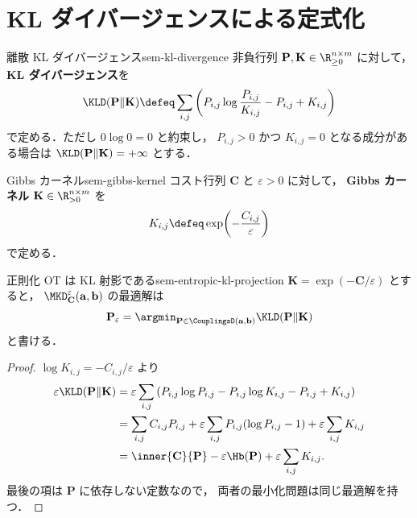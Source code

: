\section{KL ダイバージェンスによる定式化}
\label{sec:sem-kl-formulation}

\begin{definition}{離散 KL ダイバージェンス}{sem-kl-divergence}
  非負行列 $\mathbf{P}, \mathbf{K} \in \R_{\geq 0}^{n \times m}$ に対して，
  \textbf{KL ダイバージェンス}を
  \[
    \KLD(\mathbf{P} \| \mathbf{K})
    \defeq
    \sum_{i,j}
    \left(
      P_{i,j}\log\frac{P_{i,j}}{K_{i,j}}
      - P_{i,j} + K_{i,j}
    \right)
  \]
  で定める．ただし $0\log 0 = 0$ と約束し，
  $P_{i,j} > 0$ かつ $K_{i,j}=0$ となる成分がある場合は
  $\KLD(\mathbf{P}\|\mathbf{K}) = +\infty$ とする．
\end{definition}

\begin{definition}{Gibbs カーネル}{sem-gibbs-kernel}
  コスト行列 $\mathbf{C}$ と $\varepsilon > 0$ に対して，
  \textbf{Gibbs カーネル} $\mathbf{K} \in \R_{>0}^{n \times m}$ を
  \[
    K_{i,j} \defeq \exp\!\left(-\frac{C_{i,j}}{\varepsilon}\right)
  \]
  で定める．
\end{definition}

\begin{proposition}{正則化 OT は KL 射影である}{sem-entropic-kl-projection}
  $\mathbf{K} = \exp(-\mathbf{C}/\varepsilon)$ とすると，
  $\MKD_{\mathbf{C}}^\varepsilon(\mathbf{a}, \mathbf{b})$ の最適解は
  \[
    \mathbf{P}_\varepsilon
    =
    \argmin_{\mathbf{P} \in \CouplingsD(\mathbf{a}, \mathbf{b})}
    \KLD(\mathbf{P}\|\mathbf{K})
  \]
  と書ける．
\end{proposition}

\begin{proof}
  $\log K_{i,j} = -C_{i,j}/\varepsilon$ より
  \begin{align*}
    \varepsilon \KLD(\mathbf{P}\|\mathbf{K})
    &=
    \varepsilon\sum_{i,j}
    \left(
      P_{i,j}\log P_{i,j}
      - P_{i,j}\log K_{i,j}
      - P_{i,j}
      + K_{i,j}
    \right) \\
    &=
    \sum_{i,j} C_{i,j}P_{i,j}
    + \varepsilon\sum_{i,j} P_{i,j}(\log P_{i,j}-1)
    + \varepsilon\sum_{i,j} K_{i,j} \\
    &=
    \inner{\mathbf{C}}{\mathbf{P}} - \varepsilon \Hb(\mathbf{P})
    + \varepsilon\sum_{i,j} K_{i,j}.
  \end{align*}
  最後の項は $\mathbf{P}$ に依存しない定数なので，
  両者の最小化問題は同じ最適解を持つ．
\end{proof}

